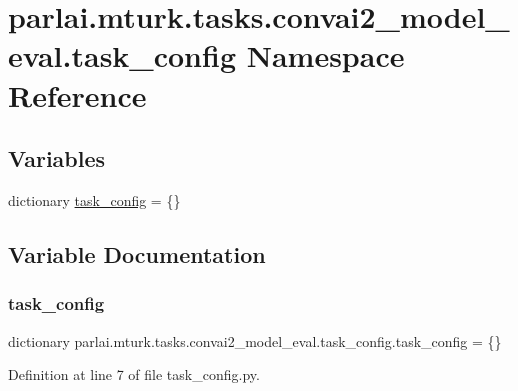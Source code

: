 \hypertarget{namespaceparlai_1_1mturk_1_1tasks_1_1convai2__model__eval_1_1task__config}{}\section{parlai.\+mturk.\+tasks.\+convai2\+\_\+model\+\_\+eval.\+task\+\_\+config Namespace Reference}
\label{namespaceparlai_1_1mturk_1_1tasks_1_1convai2__model__eval_1_1task__config}
\subsection*{Variables}
\begin{DoxyCompactItemize}
\item 
dictionary \hyperlink{namespaceparlai_1_1mturk_1_1tasks_1_1convai2__model__eval_1_1task__config_a922968d9ea146611195de53b0c93c417}{task\+\_\+config} = \{\}
\end{DoxyCompactItemize}


\subsection{Variable Documentation}
\mbox{\label{namespaceparlai_1_1mturk_1_1tasks_1_1convai2__model__eval_1_1task__config_a922968d9ea146611195de53b0c93c417}} 
\subsubsection{\texorpdfstring{task\+\_\+config}{task\_config}}
{\footnotesize\ttfamily dictionary parlai.\+mturk.\+tasks.\+convai2\+\_\+model\+\_\+eval.\+task\+\_\+config.\+task\+\_\+config = \{\}}



Definition at line 7 of file task\+\_\+config.\+py.

